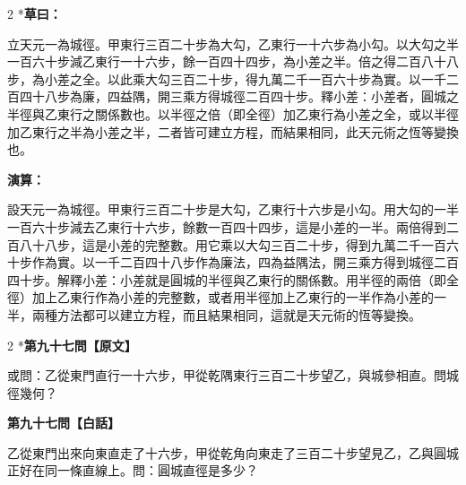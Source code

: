 \documentclass[11pt,a4paper]{article}
\begin{document}
\vspace{0.1cm}
\noindent{}
\par\vspace{0.15cm}

\begin{paracol}{2}
\switchcolumn[0]*\textbf{草曰：}

\small 立天元一為城徑。甲東行三百二十步為大勾，乙東行一十六步為小勾。以大勾之半一百六十步減乙東行一十六步，餘一百四十四步，為小差之半。倍之得二百八十八步，為小差之全。以此乘大勾三百二十步，得九萬二千一百六十步為實。以一千二百四十八步為廉，四益隅，開三乘方得城徑二百四十步。釋小差：小差者，圓城之半徑與乙東行之關係數也。以半徑之倍（即全徑）加乙東行為小差之全，或以半徑加乙東行之半為小差之半，二者皆可建立方程，而結果相同，此天元術之恆等變換也。

\switchcolumn\textbf{演算：}

\small 設天元一為城徑。甲東行三百二十步是大勾，乙東行十六步是小勾。用大勾的一半一百六十步減去乙東行十六步，餘數一百四十四步，這是小差的一半。兩倍得到二百八十八步，這是小差的完整數。用它乘以大勾三百二十步，得到九萬二千一百六十步作為實。以一千二百四十八步作為廉法，四為益隅法，開三乘方得到城徑二百四十步。解釋小差：小差就是圓城的半徑與乙東行的關係數。用半徑的兩倍（即全徑）加上乙東行作為小差的完整數，或者用半徑加上乙東行的一半作為小差的一半，兩種方法都可以建立方程，而且結果相同，這就是天元術的恆等變換。
\end{paracol}

\vspace{0.1cm}
\noindent{}
\par\vspace{0.3cm}

\begin{paracol}{2}
\switchcolumn[0]*\noindent\textbf{第九十七問【原文】}

\small 或問：乙從東門直行一十六步，甲從乾隅東行三百二十步望乙，與城參相直。問城徑幾何？

\switchcolumn\noindent\textbf{第九十七問【白話】}

\small 乙從東門出來向東直走了十六步，甲從乾角向東走了三百二十步望見乙，乙與圓城正好在同一條直線上。問：圓城直徑是多少？
\end{paracol}
\end{document}
